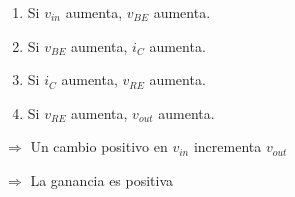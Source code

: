 \begin{frame}[t]
\begin{columns}
\begin{column}{0.6\textwidth}
            \begin{enumerate}
                \item Si $v_{in}$ aumenta, $v_{BE}$ aumenta.
                \item Si $v_{BE}$ aumenta, $i_C$ aumenta.
                \item Si $i_C$ aumenta, $v_{RE}$ aumenta.
                \item Si $v_{RE}$ aumenta, $v_{out}$ aumenta.
            \end{enumerate}

            $\Rightarrow$ Un cambio positivo en $v_{in}$ incrementa $v_{out}$

            $\Rightarrow$ La ganancia es positiva
        \end{column}
    \end{columns}
\end{frame}


